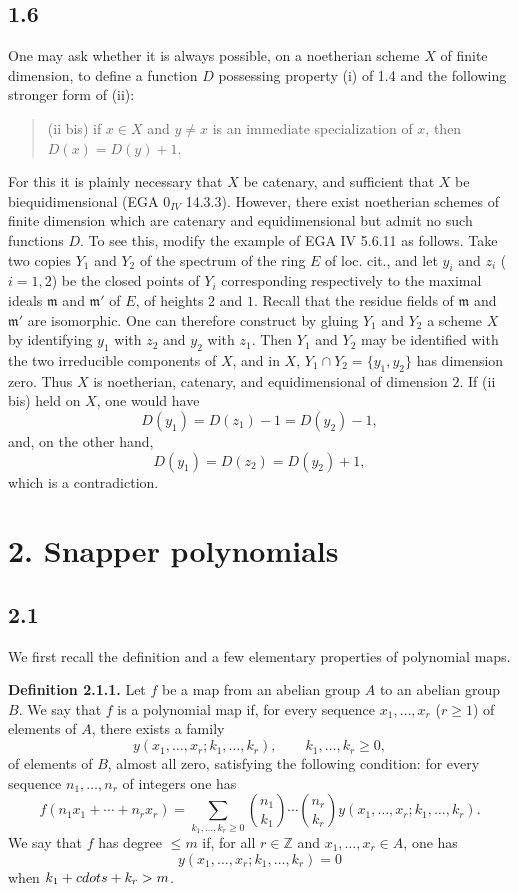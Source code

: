 \documentclass[11pt]{article}
\begin{document}
\subsection*{1.6}
One may ask whether it is always possible, on a noetherian scheme $X$ of finite dimension, to define a function $D$ possessing property (i) of 1.4 and the following stronger form of (ii):
\begin{quote}
(ii bis) if $x\in X$ and $y\ne x$ is an immediate specialization of $x$, then $D(x)=D(y)+1$.
\end{quote}
For this it is plainly necessary that $X$ be catenary, and sufficient that $X$ be biequidimensional (EGA $0_{IV}$ 14.3.3). However, there exist noetherian schemes of finite dimension which are catenary and equidimensional but admit no such functions $D$. To see this, modify the example of EGA IV 5.6.11 as follows. Take two copies $Y_1$ and $Y_2$ of the spectrum of the ring $E$ of loc. cit., and let $y_i$ and $z_i$ ($i=1,2$) be the closed points of $Y_i$ corresponding respectively to the maximal ideals $\mathfrak m$ and $\mathfrak m'$ of $E$, of heights $2$ and $1$. Recall that the residue fields of $\mathfrak m$ and $\mathfrak m'$ are isomorphic. One can therefore construct by gluing $Y_1$ and $Y_2$ a scheme $X$ by identifying $y_1$ with $z_2$ and $y_2$ with $z_1$. Then $Y_1$ and $Y_2$ may be identified with the two irreducible components of $X$, and in $X$, $Y_1\cap Y_2=\{y_1,y_2\}$ has dimension zero. Thus $X$ is noetherian, catenary, and equidimensional of dimension $2$. If (ii bis) held on $X$, one would have
\[
D(y_1)=D(z_1)-1=D(y_2)-1,
\]
and, on the other hand,
\[
D(y_1)=D(z_2)=D(y_2)+1,
\]
which is a contradiction.

\section*{2. Snapper polynomials}

\subsection*{2.1}
We first recall the definition and a few elementary properties of polynomial maps.

\textbf{Definition 2.1.1.} Let $f$ be a map from an abelian group $A$ to an abelian group $B$. We say that $f$ is a polynomial map if, for every sequence $x_1,\ldots,x_r$ ($r\geq1$) of elements of $A$, there exists a family
\[
 y(x_1,\ldots,x_r;k_1,\ldots,k_r),\qquad k_1,\ldots,k_r\geq0,
\]
of elements of $B$, almost all zero, satisfying the following condition: for every sequence $n_1,\ldots,n_r$ of integers one has
\[
 f(n_1x_1+\cdots+n_rx_r)=
 \sum_{k_1,\ldots,k_r\geq0}\binom{n_1}{k_1}\cdots\binom{n_r}{k_r}
 y(x_1,\ldots,x_r;k_1,\ldots,k_r).
\]
We say that $f$ has degree $\leq m$ if, for all $r\in\mathbb Z$ and $x_1,\ldots,x_r\in A$, one has
\[
 y(x_1,\ldots,x_r;k_1,\ldots,k_r)=0
\]
when $k_1+\\cdots+k_r>m$.
\end{document}
